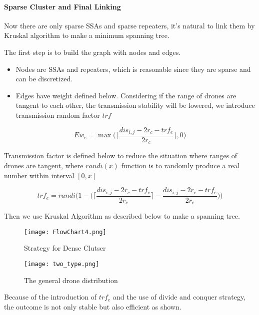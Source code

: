 \documentclass[../main]{subfiles}
\begin{document}
\paragraph{Sparse Cluster and Final Linking}

Now there are only sparse SSAs and sparse repeaters, it's natural to
link them by Kruskal algorithm to make a minimum spanning tree.

The first step is to build the graph with nodes and edges.

\begin{itemize}
\item
  Nodes are SSAs and repeaters, which is reasonable since they are
  sparse and can be discretized.
\item
  Edges have weight defined below. Considering if the range of drones
  are tangent to each other, the transmission stability will be lowered,
  we introduce transmission random factor \(trf\)
\end{itemize}

\begin{equation}
Ew_e= \max{ \Bigg(\Bigg\lceil \frac { dis_{i,j}  - 2r_c - trf_e} {2r_c} \Bigg\rceil,0\Bigg)}
\end{equation}

Transmission factor is defined below to reduce the situation where
ranges of drones are tangent, where \(randi(x)\) function is to randomly
produce a real number within interval \([0,x]\)

\begin{equation}
trf_e= randi \Bigg( 1- \Bigg(\Bigg\lceil \frac { dis_{i,j}  - 2r_c - trf_e} {2r_c} \Bigg\rceil -\frac { dis_{i,j}  - 2r_c - trf_e} {2r_c} \Bigg)\Bigg)
\end{equation}

Then we use Kruskal Algorithm\cite{kruskal} as described below to make a
spanning tree.

\newpage

\begin{figure}[h!]
      \centering
      \texttt{[image: FlowChart4.png]}
      \caption{Strategy for Dense Clutser}
    \end{figure}



\begin{figure}[h!]
      \centering
      \texttt{[image: two\_type.png]}
      \caption{The general drone distribution}
    \end{figure}

Because of the introduction of \(trf_e\) and the use of divide and
conquer strategy, the outcome is not only stable but also efficient as
shown.
\end{document}
